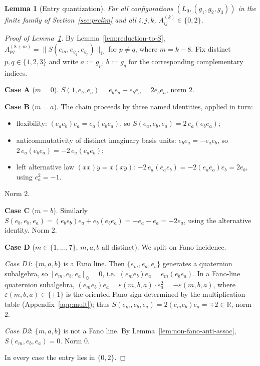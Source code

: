 \documentclass[12pt,a4paper]{article}
\newtheorem{lemma}[theorem]{Lemma}
\begin{document}
\begin{lemma}[Entry quantization]\label{lem:quant}
For all configurations $(L_0,(g_1,g_2,g_3))$ in the finite family of Section~\ref{sec:prelim} and all $i,j,k$,
$A^{(k)}_{ij}\in\{0,2\}$.
\end{lemma}

\begin{proof}[Proof of Lemma~\ref{lem:quant}]
By Lemma~\ref{lem:reduction-to-S},
$A^{(8+m)}_{pq} = \|S(e_m, e_{g_q}, e_{g_p})\|_{\mathbb{O}}$
for $p \neq q$, where $m = k - 8$.
Fix distinct $p,q\in\{1,2,3\}$ and write $a:=g_p$, $b:=g_q$ for the corresponding complementary indices.

\textbf{Case A} ($m = 0$). $S(1, e_b, e_a) = e_b e_a + e_b e_a = 2 e_b e_a$, norm $2$.

\textbf{Case B} ($m = a$). The chain proceeds by three named identities, applied in turn:
\begin{itemize}
    \item flexibility: $(e_a e_b) e_a = e_a (e_b e_a)$, so $S(e_a, e_b, e_a) = 2 \, e_a (e_b e_a)$;
    \item anticommutativity of distinct imaginary basis units: $e_b e_a = -e_a e_b$, so $2 \, e_a (e_b e_a) = -2 \, e_a (e_a e_b)$;
    \item left alternative law $(xx) y = x(xy)$: $-2 \, e_a (e_a e_b) = -2 (e_a e_a) e_b = 2 e_b$, using $e_a^2 = -1$.
\end{itemize}
Norm $2$.

\textbf{Case C} ($m = b$). Similarly
$S(e_b, e_b, e_a) = (e_b e_b)e_a + e_b(e_b e_a) = -e_a - e_a = -2 e_a$,
using the alternative identity. Norm $2$.

\textbf{Case D} ($m \in \{1,\ldots,7\}$, $m,a,b$ all distinct). We split on Fano incidence.

\emph{Case D1}: $\{m, a, b\}$ is a Fano line. Then $\{e_m, e_a, e_b\}$ generates a quaternion subalgebra, so $[e_m, e_b, e_a]_{\mathbb{O}} = 0$, i.e.\ $(e_m e_b) e_a = e_m (e_b e_a)$. In a Fano-line quaternion subalgebra, $(e_m e_b) e_a = \varepsilon(m, b, a) \cdot e_a^2 = -\varepsilon(m, b, a)$, where $\varepsilon(m, b, a) \in \{\pm 1\}$ is the oriented Fano sign determined by the multiplication table (Appendix~\ref{app:mult}); thus $S(e_m, e_b, e_a) = 2(e_m e_b) e_a = \mp 2 \in \mathbb{R}$, norm $2$.

\emph{Case D2}: $\{m, a, b\}$ is not a Fano line. By Lemma~\ref{lem:non-fano-anti-assoc}, $S(e_m, e_b, e_a) = 0$. Norm $0$.

In every case the entry lies in $\{0, 2\}$.
\end{proof}
\end{document}
